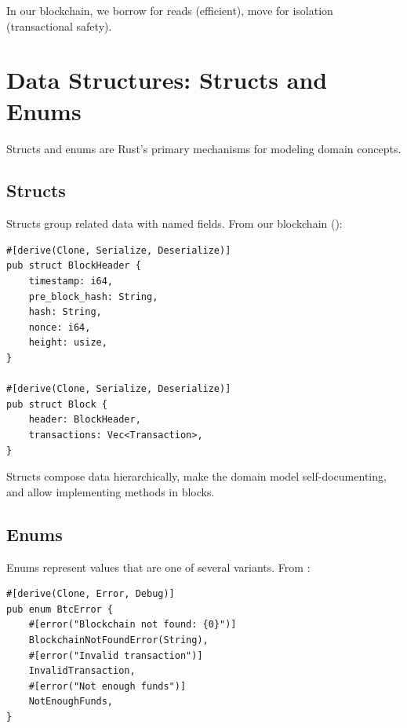In our blockchain, we borrow for reads (efficient), move for isolation (transactional safety).

\section{Data Structures: Structs and Enums}
\label{sec:ch24-data-structures}

Structs and enums are Rust's primary mechanisms for modeling domain concepts.

\subsection{Structs}
\label{subsec:ch24-structs}

Structs group related data with named fields. From our blockchain ():

\begin{listing}[htbp]
\caption{Struct definitions for blocks}
\label{lst:ch24-struct-block}
\begin{verbatim}
#[derive(Clone, Serialize, Deserialize)]
pub struct BlockHeader {
    timestamp: i64,
    pre_block_hash: String,
    hash: String,
    nonce: i64,
    height: usize,
}

#[derive(Clone, Serialize, Deserialize)]
pub struct Block {
    header: BlockHeader,
    transactions: Vec<Transaction>,
}
\end{verbatim}
\end{listing}

Structs compose data hierarchically, make the domain model self-documenting, and allow implementing methods in  blocks.

\subsection{Enums}
\label{subsec:ch24-enums}

Enums represent values that are one of several variants. From :

\begin{listing}[htbp]
\caption{Error enum with variants}
\label{lst:ch24-enum-error}
\begin{verbatim}
#[derive(Clone, Error, Debug)]
pub enum BtcError {
    #[error("Blockchain not found: {0}")]
    BlockchainNotFoundError(String),
    #[error("Invalid transaction")]
    InvalidTransaction,
    #[error("Not enough funds")]
    NotEnoughFunds,
}
\end{verbatim}
\end{listing}

